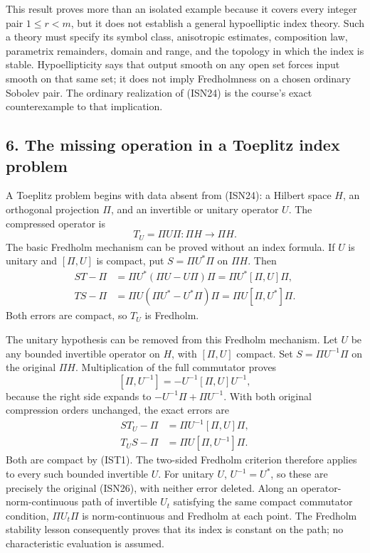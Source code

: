 \documentclass[
  11pt,
]{article}
\begin{document}
This result proves more than an isolated example because it covers every
integer pair \(1\leq r<m\), but it does not establish a general
hypoelliptic index theory. Such a theory must specify its symbol class,
anisotropic estimates, composition law, parametrix remainders, domain
and range, and the topology in which the index is stable.
Hypoellipticity says that output smooth on any open set forces input
smooth on that same set; it does not imply Fredholmness on a chosen
ordinary Sobolev pair. The ordinary realization of (ISN24) is the
course's exact counterexample to that implication.

\subsection{6. The missing operation in a Toeplitz index
problem}\label{the-missing-operation-in-a-toeplitz-index-problem}

A Toeplitz problem begins with data absent from (ISN24): a Hilbert space
\(H\), an orthogonal projection \(\Pi\), and an invertible or unitary
operator \(U\). The compressed operator is \[
 T_U=\Pi U\Pi:\Pi H\longrightarrow\Pi H.
 \tag{ISN25}
\] The basic Fredholm mechanism can be proved without an index formula.
If \(U\) is unitary and \([\Pi,U]\) is compact, put \(S=\Pi U^*\Pi\) on
\(\Pi H\). Then \[
 \begin{aligned}
 ST-\Pi
 &=\Pi U^*(\Pi U-U\Pi)\Pi
   =\Pi U^*[\Pi,U]\Pi,\\
 TS-\Pi
 &=\Pi U(\Pi U^*-U^*\Pi)\Pi
   =\Pi U[\Pi,U^*]\Pi.
 \end{aligned}
 \tag{ISN26}
\] Both errors are compact, so \(T_U\) is Fredholm.

The unitary hypothesis can be removed from this Fredholm mechanism. Let
\(U\) be any bounded invertible operator on \(H\), with \([\Pi,U]\)
compact. Set \(S=\Pi U^{-1}\Pi\) on the original \(\Pi H\).
Multiplication of the full commutator proves \[
 [\Pi,U^{-1}]=-U^{-1}[\Pi,U]U^{-1},
 \tag{IST1}
\] because the right side expands to \(-U^{-1}\Pi+ \Pi U^{-1}\). With
both original compression orders unchanged, the exact errors are \[
 \begin{aligned}
 ST_U-\Pi&=\Pi U^{-1}[\Pi,U]\Pi,\\
 T_US-\Pi&=\Pi U[\Pi,U^{-1}]\Pi .
 \end{aligned}
 \tag{IST2}
\] Both are compact by (IST1). The two-sided Fredholm criterion
therefore applies to every such bounded invertible \(U\). For unitary
\(U\), \(U^{-1}=U^*\), so these are precisely the original (ISN26), with
neither error deleted. Along an operator-norm-continuous path of
invertible \(U_t\) satisfying the same compact commutator condition,
\(\Pi U_t\Pi\) is norm-continuous and Fredholm at each point. The
Fredholm stability lesson consequently proves that its index is constant
on the path; no characteristic evaluation is assumed.
\end{document}
